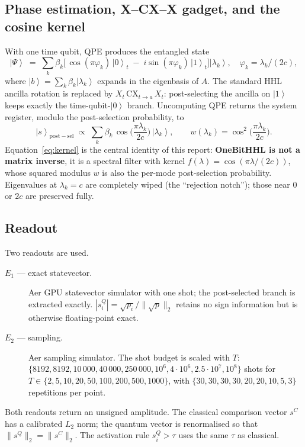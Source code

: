\documentclass[11pt,a4paper]{article}
\newcommand{\sQ}{s^{Q}}
\newcommand{\sC}{s^{C}}
\providecommand{\ket}[1]{\left|#1\right\rangle}
\begin{document}
\subsection{Phase estimation, X--CX--X gadget, and the cosine kernel}
With one time qubit, QPE produces the entangled state
\begin{equation}
\ket{\Psi} \;=\; \sum_k \beta_k \big[\,\cos(\pi\varphi_k)\,\ket{0}_t
                 \;-\; i\sin(\pi\varphi_k)\,\ket{1}_t\big]\ket{\lambda_k},
\quad \varphi_k = \lambda_k / (2c),
\end{equation}
where $\ket b = \sum_k \beta_k \ket{\lambda_k}$ expands in the eigenbasis of $A$.
The standard HHL ancilla rotation is replaced by $X_t\,\mathrm{CX}_{t\to a}\,X_t$:
post-selecting the ancilla on $\ket 1$ keeps exactly the time-qubit-$\ket 0$ branch.
Uncomputing QPE returns the system register, modulo the post-selection probability, to
\begin{equation}
\label{eq:kernel}
\ket{s}_\mathrm{post-sel} \;\propto\; \sum_k \beta_k\, \cos\!\Big(\frac{\pi \lambda_k}{2c}\Big)\,\ket{\lambda_k},
\qquad w(\lambda_k) = \cos^2\!\Big(\frac{\pi\lambda_k}{2c}\Big).
\end{equation}
Equation~\eqref{eq:kernel} is the central identity of this report: \textbf{OneBitHHL is
not a matrix inverse}, it is a spectral filter with kernel
$f(\lambda) = \cos(\pi\lambda/(2c))$, whose squared modulus $w$ is also the per-mode
post-selection probability. Eigenvalues at $\lambda_k = c$ are completely wiped (the
``rejection notch''); those near $0$ or $2c$ are preserved fully.

\subsection{Readout}
Two readouts are used.
\begin{description}
\item[$E_1$ --- exact statevector.] Aer GPU statevector simulator with one shot; the
post-selected branch is extracted exactly. $|s_i^Q| = \sqrt{p_i}/\|\sqrt p\|_2$ retains
no sign information but is otherwise floating-point exact.
\item[$E_2$ --- sampling.] Aer sampling simulator. The shot budget is scaled with $T$:
$\{8192, 8192, 10\,000, 40\,000, 250\,000, 10^6, 4\cdot 10^6, 2.5\cdot 10^7, 10^8\}$ shots
for $T \in \{2, 5, 10, 20, 50, 100, 200, 500, 1000\}$, with $\{30,30,30,30,20,20,10,5,3\}$
repetitions per point.
\end{description}
Both readouts return an unsigned amplitude. The classical comparison vector $\sC$ has a
calibrated $L_2$ norm; the quantum vector is renormalised so that
$\|\sQ\|_2 = \|\sC\|_2$. The activation rule $\sQ_i > \tau$ uses the same $\tau$ as
classical.
\end{document}
